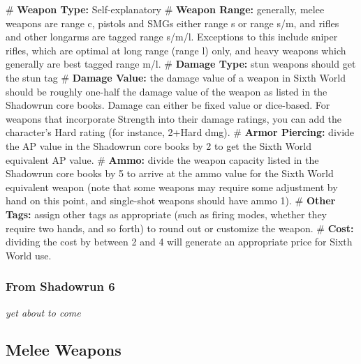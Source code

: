 \begin{easylist}
     # \textbf{Weapon Type:} Self-explanatory
     # \textbf{Weapon Range:} generally, melee weapons are range c, pistols and SMGs either range s or range s/m, and rifles and other longarms are tagged range s/m/l. Exceptions to this include  sniper rifles, which are optimal at long range (range l) only, and heavy weapons which generally are best tagged range m/l.
     # \textbf{Damage Type:} stun weapons should get the stun tag
     # \textbf{Damage Value:} the damage value of a weapon in Sixth World should be roughly one-half the damage value of the weapon as listed in the Shadowrun core books. Damage can either be fixed value or dice-based. For weapons that incorporate Strength into their damage ratings, you can add the character’s Hard rating (for instance, 2+Hard dmg).
     # \textbf{Armor Piercing:} divide the AP value in the Shadowrun core books by 2 to get the Sixth World equivalent AP value.
     # \textbf{Ammo:} divide the weapon capacity listed in the Shadowrun core books by 5 to arrive at the ammo value for the Sixth World equivalent weapon (note that some weapons may require some adjustment by hand on this point, and single-shot weapons should have ammo 1).
     # \textbf{Other Tags:} assign other tags as appropriate (such as firing modes, whether they require two hands, and so forth) to round out or customize the weapon.
     # \textbf{Cost:} dividing the cost by between 2 and 4 will generate an appropriate price for Sixth World use.
\end{easylist}


\subsubsection{From Shadowrun 6}
\textit{yet about to come}


\subsection{Melee Weapons}



